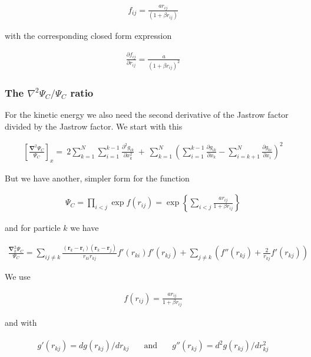 \documentclass[11pt]{article}
\begin{document}
			\begin{align}
				f_{ij}=\frac{ar_{ij}}{(1+\beta r_{ij})}
			\end{align}

			with the corresponding closed form expression

			\begin{align}
				\frac{\partial f_{ij}}{\partial r_{ij}}=\frac{a}{(1+\beta r_{ij})^{2}}
			\end{align}

		\subsubsection{The $\nabla^{2} \Psi_{C}/\Psi_{C}$ ratio}
			For the kinetic energy we also need the second derivative of the Jastrow
			factor divided by the Jastrow factor. We start with this

			\begin{align}
				\left[\frac{\mathbf{\nabla}^{2}\Psi_{C}}{\Psi_{C}}\right]_{x}=\ 2\sum_{k=1}^{N}\sum_{i=1}^{k-1}\frac{\partial^{2}g_{ik}}{\partial x_{k}^{2}}\ +\ \sum_{k=1}^{N}\left(\sum_{i=1}^{k-1}\frac{\partial g_{ik}}{\partial x_{k}}-\sum_{i=k+1}^{N}\frac{\partial g_{ki}}{\partial x_{i}}\right)^{2}
			\end{align}

			But we have another, simpler form for the function

			\begin{align}
				\Psi_{C}=\prod_{i<j}\exp f(r_{ij})=\exp\left\{ \sum_{i<j}\frac{ar_{ij}}{1+\beta r_{ij}}\right\}
			\end{align}

			and for particle $k$ we have

			\begin{align}
				\frac{\mathbf{\nabla}_{k}^{2}\Psi_{C}}{\Psi_{C}}=\sum_{ij\ne k}\frac{(\mathbf{r}_{k}-\mathbf{r}_{i})(\mathbf{r}_{k}-\mathbf{r}_{j})}{r_{ki}r_{kj}}f'(r_{ki})f'(r_{kj})+\sum_{j\ne k}\left(f''(r_{kj})+\frac{2}{r_{kj}}f'(r_{kj})\right)
			\end{align}

			We use

			\begin{align}
				f(r_{ij})=\frac{ar_{ij}}{1+\beta r_{ij}}
			\end{align}

			and with

			\begin{align}
				\begin{array}{ccc}
				g'(r_{kj})=dg(r_{kj})/dr_{kj} & \quad\mbox{and}\quad & g''(r_{kj})=d^{2}g(r_{kj})/dr_{kj}^{2}\end{array}
			\end{align}
\end{document}
